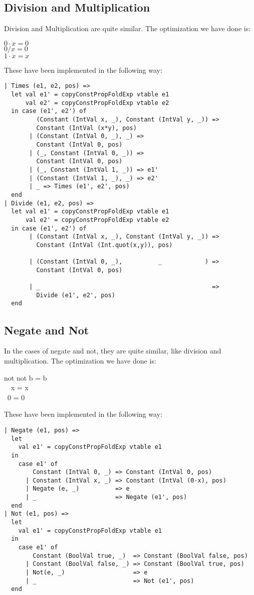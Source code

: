 \documentclass[12pt]{article}
\begin{document}
\subsection{Division and Multiplication}
Division and Multiplication are quite similar. The optimization we have done is:\\
\begin{center}
$0 \cdot x = 0$\\
$0/x = 0$\\
$1 \cdot x = x$
\begin{center}
These have been implemented in the following way:
\begin{verbatim}
| Times (e1, e2, pos) =>
  let val e1' = copyConstPropFoldExp vtable e1
      val e2' = copyConstPropFoldExp vtable e2
  in case (e1', e2') of
         (Constant (IntVal x, _), Constant (IntVal y, _)) =>
         Constant (IntVal (x*y), pos)
       | (Constant (IntVal 0, _), _) =>
         Constant (IntVal 0, pos)
       | (_, Constant (IntVal 0, _)) =>
         Constant (IntVal 0, pos)
       | (_, Constant (IntVal 1, _)) => e1'
       | (Constant (IntVal 1, _), _) => e2'
       | _ => Times (e1', e2', pos)
  end
| Divide (e1, e2, pos) =>
  let val e1' = copyConstPropFoldExp vtable e1
      val e2' = copyConstPropFoldExp vtable e2
  in case (e1', e2') of
       | (Constant (IntVal x, _), Constant (IntVal y, _)) => 
         Constant (IntVal (Int.quot(x,y)), pos)

       | (Constant (IntVal 0, _),          _            ) => 
         Constant (IntVal 0, pos)
         
       | _                                                => 
         Divide (e1', e2', pos)
  end
\end{verbatim}

\subsection{Negate and Not}
In the cases of negate and not, they are quite similar, like division and multiplication. The optimization we have done is:\\
\begin{center}
not not b = b\\
~~x = x \\
~0 = 0
\end{center}
These have been implemented in the following way:
\begin{verbatim}
| Negate (e1, pos) =>
  let
    val e1' = copyConstPropFoldExp vtable e1
  in
    case e1' of
        Constant (IntVal 0, _) => Constant (IntVal 0, pos)
      | Constant (IntVal x, _) => Constant (IntVal (0-x), pos)
      | Negate (e, _)          => e
      | _                      => Negate (e1', pos)
  end 
| Not (e1, pos) =>
  let
    val e1' = copyConstPropFoldExp vtable e1
  in
    case e1' of
        Constant (BoolVal true, _)  => Constant (BoolVal false, pos)
      | Constant (BoolVal false, _) => Constant (BoolVal true, pos) 
      | Not(e, _)                   => e
      | _                           => Not (e1', pos)
  end 
\end{verbatim}


\end{center}
\end{center}
\end{document}
